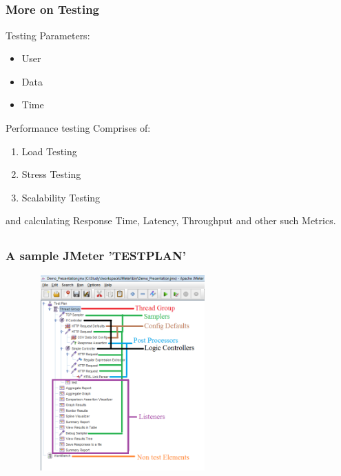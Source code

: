 \documentclass[12pt]{beamer}
\begin{document}
\subsection{}
\begin{frame}[c]
\frametitle{More on Testing}
Testing Parameters:
\begin{itemize}
\item User
\item Data
\item Time
\end{itemize}
Performance testing Comprises of:
\begin{enumerate}
\item Load Testing
\item Stress Testing
\item Scalability Testing
\end{enumerate}
and calculating Response Time, Latency, Throughput and other such Metrics.
\end{frame}

 
\subsection{}
\begin{frame}[c]
\frametitle{A sample JMeter 'TESTPLAN'}
\includegraphics[width=9cm, height=7.5cm]{images/testplan.png}
\end{frame}

\end{document}
